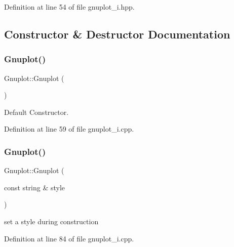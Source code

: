 Definition at line 54 of file gnuplot\+\_\+i.\+hpp.



\subsection{Constructor \& Destructor Documentation}
\mbox{\label{class_gnuplot_a936d27de7b6f57d1f3d61491dc70f1ae}} 
\subsubsection{\texorpdfstring{Gnuplot()}{Gnuplot()}\hspace{0.1cm}{\footnotesize\ttfamily [1/4]}}
{\footnotesize\ttfamily Gnuplot\+::\+Gnuplot (\begin{DoxyParamCaption}{ }\end{DoxyParamCaption})}



Default Constructor. 



Definition at line 59 of file gnuplot\+\_\+i.\+cpp.

\mbox{\label{class_gnuplot_a4acdc327a6a9eb3c4ab3f37814dce26e}} 
\subsubsection{\texorpdfstring{Gnuplot()}{Gnuplot()}\hspace{0.1cm}{\footnotesize\ttfamily [2/4]}}
{\footnotesize\ttfamily Gnuplot\+::\+Gnuplot (\begin{DoxyParamCaption}\item[{const string \&}]{style }\end{DoxyParamCaption})}



set a style during construction 



Definition at line 84 of file gnuplot\+\_\+i.\+cpp.

\mbox{\label{class_gnuplot_ab777a09e0527b64f3980788f73400257}} 
